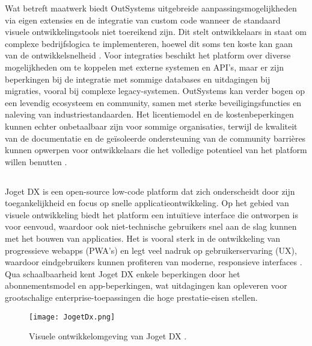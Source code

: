 Wat betreft maatwerk biedt OutSystems uitgebreide aanpassingsmogelijkheden via eigen extensies en de integratie van custom code wanneer de standaard visuele ontwikkelingstools niet toereikend zijn. Dit stelt ontwikkelaars in staat om complexe bedrijfslogica te implementeren, hoewel dit soms ten koste kan gaan van de ontwikkelsnelheid \autocite{Sido2024}. Voor integraties beschikt het platform over diverse mogelijkheden om te koppelen met externe systemen en API's, maar er zijn beperkingen bij de integratie met sommige databases en uitdagingen bij migraties, vooral bij complexe legacy-systemen. OutSystems kan verder bogen op een levendig ecosysteem en community, samen met sterke beveiligingsfuncties en naleving van industriestandaarden. Het licentiemodel en de kostenbeperkingen kunnen echter onbetaalbaar zijn voor sommige organisaties, terwijl de kwaliteit van de documentatie en de geïsoleerde ondersteuning van de community barrières kunnen opwerpen voor ontwikkelaars die het volledige potentieel van het platform willen benutten \autocite{Sido2024}.


\subsection{}
Joget DX is een open-source low-code platform dat zich onderscheidt door zijn toegankelijkheid en focus op snelle applicatieontwikkeling. Op het gebied van visuele ontwikkeling biedt het platform een intuïtieve interface die ontworpen is voor eenvoud, waardoor ook niet-technische gebruikers snel aan de slag kunnen met het bouwen van applicaties. Het is vooral sterk in de ontwikkeling van progressieve webapps (PWA's) en legt veel nadruk op gebruikerservaring (UX), waardoor eindgebruikers kunnen profiteren van moderne, responsieve interfaces \autocite{Sido2024}. Qua schaalbaarheid kent Joget DX enkele beperkingen door het abonnementsmodel en app-beperkingen, wat uitdagingen kan opleveren voor grootschalige enterprise-toepassingen die hoge prestatie-eisen stellen.

\begin{figure}[H]
    \centering
    \texttt{[image: JogetDx.png]}
    \caption[Visuele ontwikkelomgeving Joget DX]{\label{fig:jogetDx} Visuele ontwikkelomgeving van Joget DX \autocite{Hugo2024}.}
\end{figure}

